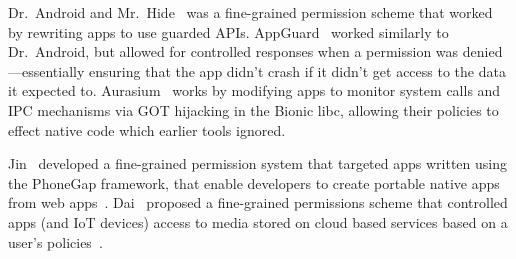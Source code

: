 \documentclass[thesis.tex]{subfiles}
\begin{document}
Dr{.}~Android and Mr{.}~Hide~\cite{jeon_dr._2012} was a fine-grained permission
scheme that worked by rewriting apps to use guarded APIs.
AppGuard~\cite{backes_appguard_2013} worked similarly to Dr{.}~Android, but
allowed for controlled responses when a permission was denied---essentially
ensuring that the app didn't crash if it didn't get access to the data it
expected to. Aurasium~\cite{xu_aurasium:_2012} works by modifying apps to
monitor system calls and IPC mechanisms via GOT hijacking in the Bionic libc,
allowing their policies to effect native code which earlier tools ignored.

Jin~\etal{} developed a fine-grained permission system that targeted apps
written using the PhoneGap framework, that enable developers to create portable
native apps from web apps~\cite{jin_fine-grained_2015}. Dai~\etal{} proposed a
fine-grained permissions scheme that controlled apps (and IoT devices) access to
media stored on cloud based services based on a user's
policies~\cite{dai_who_2017}.

%
%
%
\end{document}
